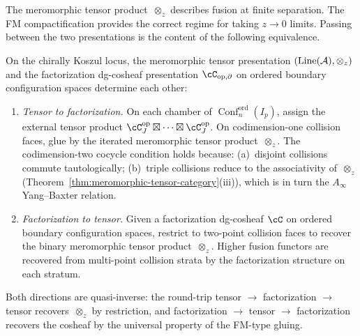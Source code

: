 The meromorphic tensor product~$\otimes_z$ describes
fusion at finite separation. The FM compactification provides the
correct regime for taking $z \to 0$ limits. Passing between the
two presentations is the content of the following equivalence.

\begin{theorem}
\label{thm:meromorphic-factorization-equiv}
On the chirally Koszul locus, the meromorphic tensor presentation
$(\operatorname{Line}(\mathcal{A}), \otimes_z)$
and the factorization dg-cosheaf presentation
$\cC_{\mathrm{op},\partial}$ on ordered boundary configuration
spaces determine each other:
\begin{enumerate}[label=\textup{(\roman*)}]
\item \emph{Tensor to factorization.} On each chamber of
 $\operatorname{Conf}_n^{\mathrm{ord}}(I_p)$, assign the
 external tensor product
 $\cC_J^{\mathrm{op}} \boxtimes \cdots \boxtimes
 \cC_J^{\mathrm{op}}$. On codimension-one collision faces,
 glue by the iterated meromorphic tensor product~$\otimes_z$.
 The codimension-two cocycle condition holds because:
 \textup{(a)}~disjoint collisions commute tautologically;
 \textup{(b)}~triple collisions reduce to the associativity
 of~$\otimes_z$
 \textup{(}Theorem~\textup{\ref{thm:meromorphic-tensor-category}(iii)}\textup{)},
 which is in turn the $A_\infty$ Yang--Baxter relation.

\item \emph{Factorization to tensor.} Given a factorization
 dg-cosheaf $\cC$ on ordered boundary configuration spaces,
 restrict to two-point collision faces to recover
 the binary meromorphic tensor product~$\otimes_z$. Higher
 fusion functors are recovered from multi-point collision
 strata by the factorization structure on each stratum.
\end{enumerate}
Both directions are quasi-inverse: the round-trip
tensor $\to$ factorization $\to$ tensor recovers~$\otimes_z$
by restriction, and factorization $\to$ tensor $\to$
factorization recovers the cosheaf by the universal property
of the FM-type gluing.
\end{theorem}

